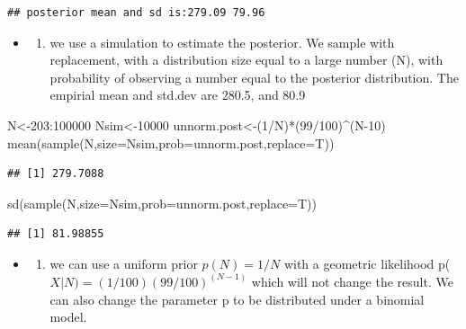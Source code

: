 \documentclass[
]{book}
\newenvironment{Shaded}{\begin{snugshade}}{\end{snugshade}}
\newcommand{\AttributeTok}[1]{\textcolor[rgb]{0.77,0.63,0.00}{#1}}
\newcommand{\DecValTok}[1]{\textcolor[rgb]{0.00,0.00,0.81}{#1}}
\newcommand{\FunctionTok}[1]{\textcolor[rgb]{0.00,0.00,0.00}{#1}}
\newcommand{\NormalTok}[1]{#1}
\newcommand{\OtherTok}[1]{\textcolor[rgb]{0.56,0.35,0.01}{#1}}
\newcommand{\SpecialCharTok}[1]{\textcolor[rgb]{0.00,0.00,0.00}{#1}}
\providecommand{\tightlist}{%
  \setlength{\itemsep}{0pt}\setlength{\parskip}{0pt}}
\theoremstyle{definition}
\theoremstyle{definition}
\theoremstyle{definition}
\theoremstyle{definition}
\theoremstyle{remark}
\begin{document}
\begin{verbatim}
## posterior mean and sd is:279.09 79.96
\end{verbatim}

\begin{itemize}
\item
  \begin{enumerate}
  \def\labelenumi{(\alph{enumi})}
  \setcounter{enumi}{1}
  \tightlist
  \item
    we use a simulation to estimate the posterior. We sample with replacement, with a distribution size equal to a large number (N), with probability of observing a number equal to the posterior distribution. The empirial mean and std.dev are 280.5, and 80.9
  \end{enumerate}
\end{itemize}

\begin{Shaded}
\begin{Highlighting}[]
\NormalTok{ N}\OtherTok{\textless{}{-}}\DecValTok{203}\SpecialCharTok{:}\DecValTok{100000}
\NormalTok{ Nsim}\OtherTok{\textless{}{-}}\DecValTok{10000}
\NormalTok{ unnorm.post}\OtherTok{\textless{}{-}}\NormalTok{(}\DecValTok{1}\SpecialCharTok{/}\NormalTok{N)}\SpecialCharTok{*}\NormalTok{(}\DecValTok{99}\SpecialCharTok{/}\DecValTok{100}\NormalTok{)}\SpecialCharTok{\^{}}\NormalTok{(N}\DecValTok{{-}10}\NormalTok{)}
 \FunctionTok{mean}\NormalTok{(}\FunctionTok{sample}\NormalTok{(N,}\AttributeTok{size=}\NormalTok{Nsim,}\AttributeTok{prob=}\NormalTok{unnorm.post,}\AttributeTok{replace=}\NormalTok{T))}
\end{Highlighting}
\end{Shaded}

\begin{verbatim}
## [1] 279.7088
\end{verbatim}

\begin{Shaded}
\begin{Highlighting}[]
 \FunctionTok{sd}\NormalTok{(}\FunctionTok{sample}\NormalTok{(N,}\AttributeTok{size=}\NormalTok{Nsim,}\AttributeTok{prob=}\NormalTok{unnorm.post,}\AttributeTok{replace=}\NormalTok{T))}
\end{Highlighting}
\end{Shaded}

\begin{verbatim}
## [1] 81.98855
\end{verbatim}

\begin{itemize}
\item
  \begin{enumerate}
  \def\labelenumi{(\alph{enumi})}
  \setcounter{enumi}{2}
  \tightlist
  \item
    we can use a uniform prior \(p(N) = 1/N\) with a geometric likelihood p(\(X|N)=(1/100)(99/100)^(N-1)\) which will not change the result. We can also change the parameter p to be distributed under a binomial model.
  \end{enumerate}
\end{itemize}
\end{document}
